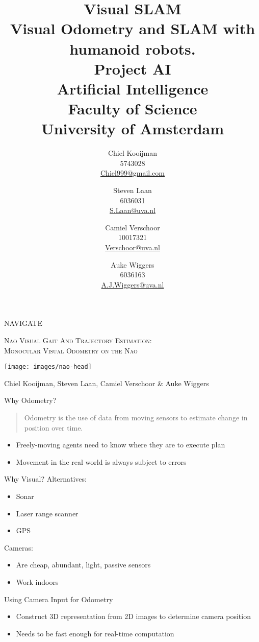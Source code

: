 \documentclass{beamer}
\author{Chiel Kooijman\\5743028\\\url{Chiel999@gmail.com} \and
Steven Laan\\6036031\\\url{S.Laan@uva.nl} \and
Camiel Verschoor\\10017321\\\url{Verschoor@uva.nl} \and
Auke Wiggers\\6036163\\\url{A.J.Wiggers@uva.nl}}
\title{Visual SLAM\\ \normalsize Visual Odometry and SLAM with humanoid
robots.\\Project AI\\Artificial Intelligence\\Faculty of Science\\ University
of Amsterdam}
\begin{document}
\begin{frame}
	\begin{center}
		{\LARGE NAVIGATE}
	\end{center}

	\begin{center}
		\textsc{Nao Visual Gait And Trajectory Estimation:}\\
		\textsc{\small Monocular Visual Odometry on the Nao}
	\end{center}

	\begin{center}
		\texttt{[image: images/nao-head]}
	\end{center}

	\begin{center}
		Chiel Kooijman, Steven Laan, Camiel Verschoor \& Auke Wiggers
	\end{center}
\end{frame}

\begin{frame}{Why Odometry?}
	\begin{quote}
		Odometry is the use of data from moving sensors to estimate change in
		position over time.
	\end{quote}

	\begin{itemize}
		\item Freely-moving agents need to know where they are to execute plan
		\item Movement in the real world is always subject to errors
	\end{itemize}
\end{frame}

\begin{frame}{Why Visual?}
	Alternatives:
	\begin{itemize}
		\item Sonar
		\item Laser range scanner
		\item GPS
	\end{itemize}

	Cameras:
	\begin{itemize}
		\item Are cheap, abundant, light, passive sensors
		\item	Work indoors
	\end{itemize}
\end{frame}

\begin{frame}{Using Camera Input for Odometry}
	\begin{itemize}
		\item Construct 3D representation from 2D images to determine camera
			position
		\item Needs to be fast enough for real-time computation
	\end{itemize}
\end{frame}
\end{document}
